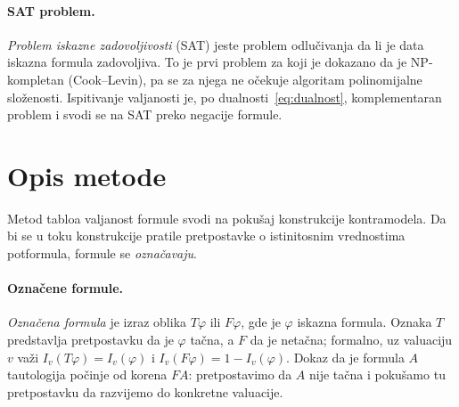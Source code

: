 \documentclass[a4paper,10pt]{article}
\begin{document}
\paragraph{SAT problem.}
\emph{Problem iskazne zadovoljivosti} (SAT) jeste problem odlučivanja da li je
data iskazna formula zadovoljiva. To je prvi problem za koji je dokazano da je
NP-kompletan (Cook--Levin), pa se za njega ne očekuje algoritam polinomijalne
složenosti. Ispitivanje valjanosti je, po dualnosti~\eqref{eq:dualnost},
komplementaran problem i svodi se na SAT preko negacije formule.

\section{Opis metode}
\label{sec:opis_metode}

Metod tabloa valjanost formule svodi na pokušaj konstrukcije kontramodela.
Da bi se u toku konstrukcije pratile pretpostavke o istinitosnim vrednostima
potformula, formule se \emph{označavaju}.

\paragraph{Označene formule.}
\emph{Označena formula} je izraz oblika $T\varphi$ ili $F\varphi$, gde je
$\varphi$ iskazna formula. Oznaka $T$ predstavlja pretpostavku da je $\varphi$
tačna, a $F$ da je netačna; formalno, uz valuaciju $v$ važi
$I_v(T\varphi) = I_v(\varphi)$ i $I_v(F\varphi) = 1 - I_v(\varphi)$. Dokaz da je
formula $A$ tautologija počinje od korena $FA$: pretpostavimo da $A$ nije tačna
i pokušamo tu pretpostavku da razvijemo do konkretne valuacije.
\end{document}
